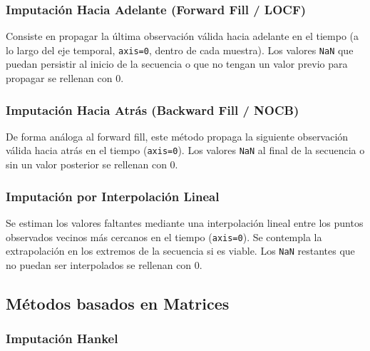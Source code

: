 \subsubsection*{Imputación Hacia Adelante (Forward Fill / LOCF)}
Consiste en propagar la última observación válida hacia adelante en el tiempo (a lo largo del eje temporal, \texttt{axis=0}, dentro de cada muestra). Los valores \texttt{NaN} que puedan persistir al inicio de la secuencia o que no tengan un valor previo para propagar se rellenan con $0$.

\subsubsection*{Imputación Hacia Atrás (Backward Fill / NOCB)}
De forma análoga al forward fill, este método propaga la siguiente observación válida hacia atrás en el tiempo (\texttt{axis=0}). Los valores \texttt{NaN} al final de la secuencia o sin un valor posterior se rellenan con $0$.

\subsubsection*{Imputación por Interpolación Lineal}
Se estiman los valores faltantes mediante una interpolación lineal entre los puntos observados vecinos más cercanos en el tiempo (\texttt{axis=0}). Se contempla la extrapolación en los extremos de la secuencia si es viable. Los \texttt{NaN} restantes que no puedan ser interpolados se rellenan con $0$.

\subsection{Métodos basados en Matrices}

\subsubsection*{Imputación Hankel}


